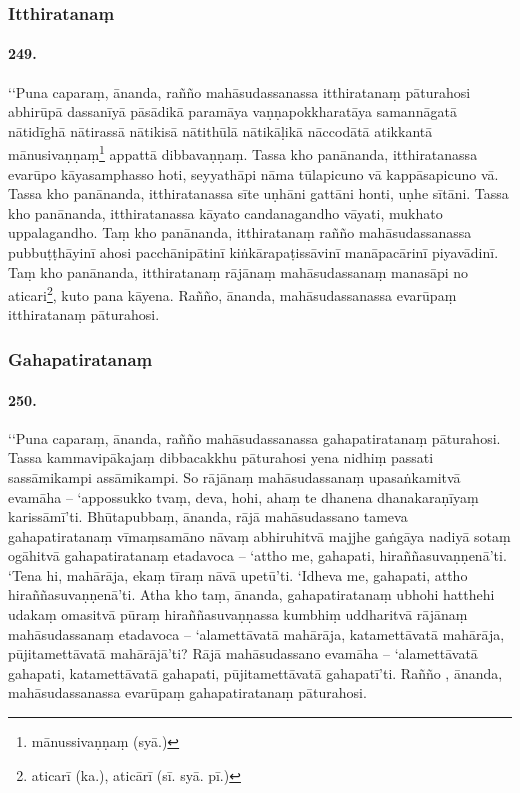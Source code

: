 \subsubsection{Itthiratanaṃ}

\paragraph{249.} ‘‘Puna caparaṃ, ānanda, rañño mahāsudassanassa itthiratanaṃ pāturahosi abhirūpā dassanīyā pāsādikā paramāya vaṇṇapokkharatāya samannāgatā nātidīghā nātirassā nātikisā nātithūlā nātikāḷikā nāccodātā atikkantā mānusivaṇṇaṃ\footnote{mānussivaṇṇaṃ (syā.)} appattā dibbavaṇṇaṃ. Tassa kho panānanda, itthiratanassa evarūpo kāyasamphasso hoti, seyyathāpi nāma tūlapicuno vā kappāsapicuno vā. Tassa kho panānanda, itthiratanassa sīte uṇhāni gattāni honti, uṇhe sītāni. Tassa kho panānanda, itthiratanassa kāyato candanagandho vāyati, mukhato uppalagandho. Taṃ kho panānanda, itthiratanaṃ rañño mahāsudassanassa pubbuṭṭhāyinī ahosi pacchānipātinī kiṅkārapaṭissāvinī manāpacārinī piyavādinī. Taṃ kho panānanda, itthiratanaṃ rājānaṃ mahāsudassanaṃ manasāpi no aticari\footnote{aticarī (ka.), aticārī (sī. syā. pī.)}, kuto pana kāyena. Rañño, ānanda, mahāsudassanassa evarūpaṃ itthiratanaṃ pāturahosi.

\subsubsection{Gahapatiratanaṃ}

\paragraph{250.} ‘‘Puna caparaṃ, ānanda, rañño mahāsudassanassa gahapatiratanaṃ pāturahosi. Tassa kammavipākajaṃ dibbacakkhu pāturahosi yena nidhiṃ passati sassāmikampi assāmikampi. So rājānaṃ mahāsudassanaṃ upasaṅkamitvā evamāha – ‘appossukko tvaṃ, deva, hohi, ahaṃ te dhanena dhanakaraṇīyaṃ karissāmī’ti. Bhūtapubbaṃ, ānanda, rājā mahāsudassano tameva gahapatiratanaṃ vīmaṃsamāno nāvaṃ abhiruhitvā majjhe gaṅgāya nadiyā sotaṃ ogāhitvā gahapatiratanaṃ etadavoca – ‘attho me, gahapati, hiraññasuvaṇṇenā’ti. ‘Tena hi, mahārāja, ekaṃ tīraṃ nāvā upetū’ti. ‘Idheva me, gahapati, attho hiraññasuvaṇṇenā’ti. Atha kho taṃ, ānanda, gahapatiratanaṃ ubhohi hatthehi udakaṃ omasitvā pūraṃ hiraññasuvaṇṇassa kumbhiṃ uddharitvā rājānaṃ mahāsudassanaṃ etadavoca – ‘alamettāvatā mahārāja, katamettāvatā mahārāja, pūjitamettāvatā mahārājā’ti? Rājā mahāsudassano evamāha – ‘alamettāvatā gahapati, katamettāvatā gahapati, pūjitamettāvatā gahapatī’ti. Rañño , ānanda, mahāsudassanassa evarūpaṃ gahapatiratanaṃ pāturahosi.

